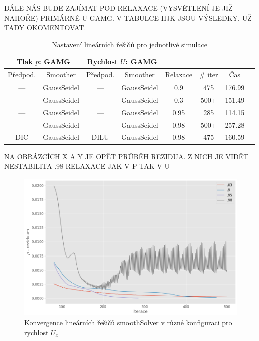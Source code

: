 \documentclass[a4paper,12pt]{report}
\theoremstyle{remark}
\begin{document}
DÁLE NÁS BUDE ZAJÍMAT POD-RELAXACE (VYSVĚTLENÍ JE JIŽ NAHOŘE) PRIMÁRNĚ U GAMG. V TABULCE HJK JSOU VÝSLEDKY. UŽ TADY OKOMENTOVAT.

 \begin{table}[H]
	\centering
	\caption{Nastavení lineárních řešičů pro jednotlivé simulace}
	\renewcommand{\arraystretch}{1.9}
	\begin{tabular}{*8c}
		\toprule
		\multicolumn{2}{c}{Tlak $p$: \textbf{GAMG}} & \multicolumn{2}{c}{Rychlost $U$: \textbf{GAMG}}\\		
		\midrule
		Předpod.&Smoother&Předpod.&Smoother&Relaxace& \# iter&Čas\\
		
		\midrule
		
		--- & GaussSeidel &  --- & GaussSeidel & 0.9&475&176.99\\
		--- & GaussSeidel &  --- & GaussSeidel & 0.3&500+&151.49\\
		--- & GaussSeidel &  --- & GaussSeidel & 0.95&285&114.15\\
		--- & GaussSeidel &  --- & GaussSeidel & 0.98&500+&257.28\\		
		DIC & GaussSeidel &  DILU & GaussSeidel & 0.98&475&160.59\\
		\bottomrule
	\end{tabular}
	
	\label{table:solvers_gamg_relax}
	
\end{table}

NA OBRÁZCÍCH X A Y JE OPĚT PRŮBĚH REZIDUA. Z NICH JE VIDĚT NESTABILITA .98 RELAXACE JAK V P TAK V U

\begin{figure}[H]
	\centering
	\includegraphics[width=1\linewidth]{p-under-relax.png}
	\caption{Konvergence lineárních řešičů smoothSolver v různé konfiguraci pro rychlost $U_x$}
	\label{fig:p-residuum-relax}
\end{figure}
\end{document}
